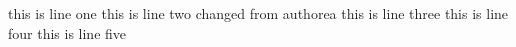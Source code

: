this is line one
this is line two changed from authorea
this is line three
this is line four
this is line five